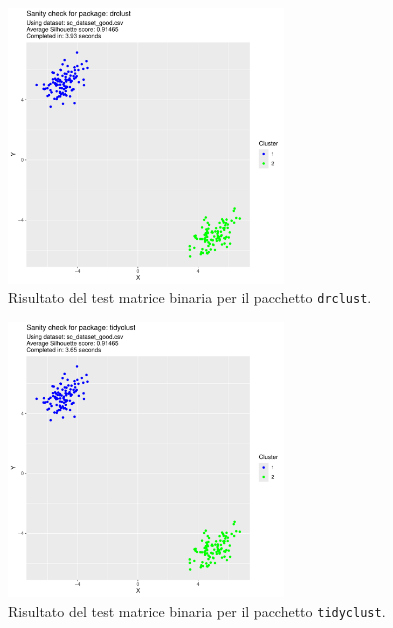 \documentclass[a4paper, 12pt]{report}
\begin{document}
			\begin{figure}[H]
				\centering
				\includegraphics[width = 0.65\textwidth, page = 3]{results/results_DRCLUST.pdf}
				\caption{Risultato del test matrice binaria per il pacchetto \texttt{drclust}.}
				\label{fig:drclustbm}
			\end{figure}

			\begin{figure}[H]
				\centering
				\includegraphics[width = 0.65\textwidth, page = 3]{results/results_TIDYCLUST.pdf}
				\caption{Risultato del test matrice binaria per il pacchetto \texttt{tidyclust}.}
				\label{fig:tidyclustbm}
			\end{figure}
\end{document}
